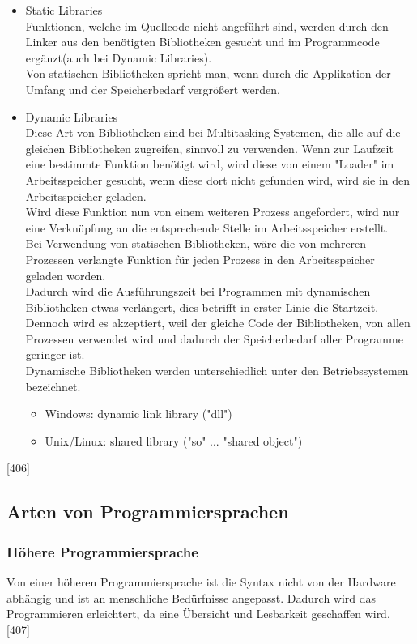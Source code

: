 \documentclass[12pt,a4paper]{report}
\begin{document}
\begin{onehalfspace}
\begin{itemize}
\item Static Libraries\\
Funktionen, welche im Quellcode nicht angeführt sind, werden durch den Linker aus den benötigten Bibliotheken gesucht und im Programmcode ergänzt(auch bei Dynamic Libraries).
\\Von statischen Bibliotheken spricht man, wenn durch die Applikation der Umfang und der Speicherbedarf vergrößert werden.
\item Dynamic Libraries\\
Diese Art von Bibliotheken sind bei Multitasking-Systemen, die alle auf die gleichen Bibliotheken zugreifen, sinnvoll zu verwenden. Wenn zur Laufzeit eine bestimmte Funktion benötigt wird, wird diese von einem "{}Loader"{} im Arbeitsspeicher gesucht, wenn diese dort nicht gefunden wird, wird sie in den Arbeitsspeicher geladen.
\\Wird diese Funktion nun von einem weiteren Prozess angefordert, wird nur eine Verknüpfung an die entsprechende Stelle im Arbeitsspeicher erstellt.\\

Bei Verwendung von statischen Bibliotheken, wäre die von mehreren Prozessen verlangte Funktion für jeden Prozess in den Arbeitsspeicher geladen worden.\\

Dadurch wird die Ausführungszeit bei Programmen mit dynamischen Bibliotheken etwas verlängert, dies betrifft in erster Linie die Startzeit. Dennoch wird es akzeptiert, weil der gleiche Code der Bibliotheken, von allen Prozessen verwendet wird und dadurch der Speicherbedarf aller Programme geringer ist.
\\Dynamische Bibliotheken werden unterschiedlich unter den Betriebssystemen bezeichnet.
\begin{itemize}
\item Windows: dynamic link library ("{}dll"{})
\item Unix/Linux: shared library ("{}so"{} ... "{}shared object"{})
\end{itemize}
\end{itemize}
[406]

\subsection{Arten von Programmiersprachen}
\subsubsection{Höhere Programmiersprache} 
Von einer höheren Programmiersprache ist die Syntax nicht von der Hardware abhängig und ist an menschliche Bedürfnisse angepasst. Dadurch wird das Programmieren erleichtert, da eine Übersicht und Lesbarkeit geschaffen wird. [407]


\end{onehalfspace}
\end{document}
